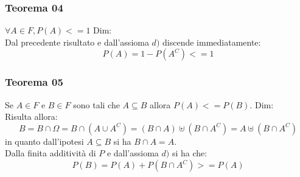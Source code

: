 \subsubsection{Teorema 04}
$\forall A \in F, P(A) <=1$
Dim:\\
Dal precedente risultato e dall'assioma $d)$ discende immediatamente:
$$ P(A)= 1-P(A^C) <= 1$$

\subsubsection{Teorema 05}
Se $A \in F$ e $B \in F$ sono tali che $A \subseteq B$ allora $P(A) <= P(B)$.
Dim: \\
Risulta allora:
$$ B = B \cap \Omega = B \cap (A \cup A^C) = (B \cap A) \uplus (B \cap A^C) = A \uplus (B \cap A^C)$$
in quanto dall'ipotesi $A \subseteq B$ si ha $B \cap A = A$.\\
Dalla finita additività di $P$ e dall'assioma $d)$ si ha che:
$$ P(B) = P(A) + P(B \cap A^C) >= P(A)$$



